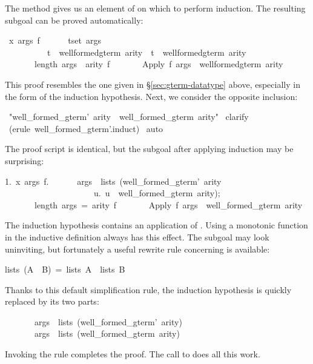 The  method gives
us an element of  on which to perform 
induction.  The resulting subgoal can be proved automatically:
\begin{isabelle}
{}{\isachardot}\ {\isasymAnd}x\ args\ f{\isachardot}\isanewline
\ \ \ \ \ \ {\isasymlbrakk}{\isasymforall}t{\isasymin}set\ args{\isachardot}\isanewline
\ \ \ \ \ \ \ \ \ \ t\ {\isasymin}\ well{\isacharunderscore}formed{\isacharunderscore}gterm\ arity\ {\isasymand}\ t\ {\isasymin}\ well{\isacharunderscore}formed{\isacharunderscore}gterm{\isacharprime}\ arity{\isacharsemicolon}\isanewline
\ \ \ \ \ \ \ length\ args\ {\isacharequal}\ arity\ f{\isasymrbrakk}\isanewline
\ \ \ \ \ \ {\isasymLongrightarrow}\ Apply\ f\ args\ {\isasymin}\ well{\isacharunderscore}formed{\isacharunderscore}gterm{\isacharprime}\ arity%
\end{isabelle}
%
This proof resembles the one given in
\S\ref{sec:gterm-datatype} above, especially in the form of the
induction hypothesis.  Next, we consider the opposite inclusion:
\begin{isabelle}
\ "well_formed_gterm'\ arity\ \isasymsubseteq \ well_formed_gterm\ arity"\isanewline
{}\ clarify\isanewline
{}\ (erule\ well_formed_gterm'.induct)\isanewline
{}\ auto\isanewline
{}
\end{isabelle}
%
The proof script is identical, but the subgoal after applying induction may
be surprising:
\begin{isabelle}
1.\ \isasymAnd x\ args\ f.\isanewline
\ \ \ \ \ \ \isasymlbrakk args\ \isasymin \ lists\ (well_formed_gterm'\ arity\ \isasyminter\isanewline
\ \ \ \ \ \ \ \ \ \ \ \ \ \ \ \ \ \ \ \ \ \isacharbraceleft u.\ u\ \isasymin \ well_formed_gterm\ arity\isacharbraceright );\isanewline
\ \ \ \ \ \ \ length\ args\ =\ arity\ f\isasymrbrakk \isanewline
\ \ \ \ \ \ \isasymLongrightarrow \ Apply\ f\ args\ \isasymin \ well_formed_gterm\ arity%
\end{isabelle}
The induction hypothesis contains an application of .  Using a
monotonic function in the inductive definition always has this effect.  The
subgoal may look uninviting, but fortunately a useful rewrite rule concerning
 is available:
\begin{isabelle}
lists\ (A\ \isasyminter \ B)\ =\ lists\ A\ \isasyminter \ lists\ B
\end{isabelle}
%
Thanks to this default simplification rule, the induction hypothesis 
is quickly replaced by its two parts:
\begin{isabelle}
\ \ \ \ \ \ \ args\ \isasymin \ lists\ (well_formed_gterm'\ arity)\isanewline
\ \ \ \ \ \ \ args\ \isasymin \ lists\ (well_formed_gterm\ arity)
\end{isabelle}
Invoking the rule  completes the proof.  The
call to
 does all this work.

